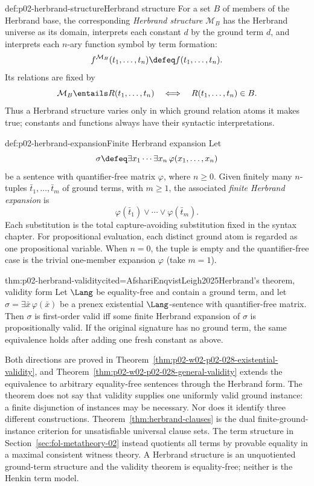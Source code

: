 \begin{hbdefinition}{def:p02-herbrand-structure}{Herbrand structure}
For a set \(B\) of members of the Herbrand base, the corresponding
\emph{Herbrand structure} \(\mathcal M_B\) has the Herbrand universe as its
domain, interprets each constant \(d\) by the ground term \(d\), and interprets
each \(n\)-ary function symbol by term formation:
\[
 f^{\mathcal M_B}(t_1,\ldots,t_n)
   \defeq f(t_1,\ldots,t_n).
\]
Its relations are fixed by
\[
 \mathcal M_B\entails R(t_1,\ldots,t_n)
 \quad\Longleftrightarrow\quad
 R(t_1,\ldots,t_n)\in B.
\]
Thus a Herbrand structure varies only in which ground relation atoms it makes
true; constants and functions always have their syntactic interpretations.
\end{hbdefinition}

\begin{hbdefinition}{def:p02-herbrand-expansion}{Finite Herbrand expansion}
Let
\[
 \sigma\defeq\exists x_1\cdots\exists x_n\,\varphi(x_1,\ldots,x_n)
\]
be a sentence with quantifier-free matrix \(\varphi\), where \(n\geq0\).  Given
finitely many \(n\)-tuples \(\bar t_1,\ldots,\bar t_m\) of ground terms, with
\(m\geq1\), the associated \emph{finite Herbrand expansion} is
\[
 \varphi(\bar t_1)\lor\cdots\lor\varphi(\bar t_m).
\]
Each substitution is the total capture-avoiding substitution fixed in the
syntax chapter.  For propositional evaluation, each distinct ground atom is
regarded as one propositional variable.  When \(n=0\), the tuple is empty and
the quantifier-free case is the trivial one-member expansion \(\varphi\) (take
\(m=1\)).
\end{hbdefinition}

\begin{hbtheorem}{thm:p02-herbrand-validity}{cited=AfshariEnqvistLeigh2025}{Herbrand's theorem, validity form}
Let \(\Lang\) be equality-free and contain a ground term, and let
\(\sigma=\exists\bar x\,\varphi(\bar x)\) be a prenex existential \(\Lang\)-sentence
with quantifier-free matrix.  Then \(\sigma\) is first-order valid iff some
finite Herbrand expansion of \(\sigma\) is propositionally valid.  If the
original signature has no ground term, the same equivalence holds after adding
one fresh constant as above.
\end{hbtheorem}

Both directions are proved in
Theorem~\ref{thm:p02-w02-p02-028-existential-validity}, and
Theorem~\ref{thm:p02-w02-p02-028-general-validity} extends the equivalence to
arbitrary equality-free sentences through the Herbrand form.
The theorem does not say that validity supplies one uniformly valid ground
instance: a finite disjunction of instances may be necessary.  Nor does it
identify three different constructions.  Theorem~\ref{thm:herbrand-clauses}
is the dual finite-ground-instance criterion for unsatisfiable universal clause
sets.  The term structure in Section~\ref{sec:fol-metatheory-02} instead quotients all
terms by provable equality in a maximal consistent witness theory.  A Herbrand
structure is an unquotiented ground-term structure and the validity theorem is
equality-free; neither is the Henkin term model.

